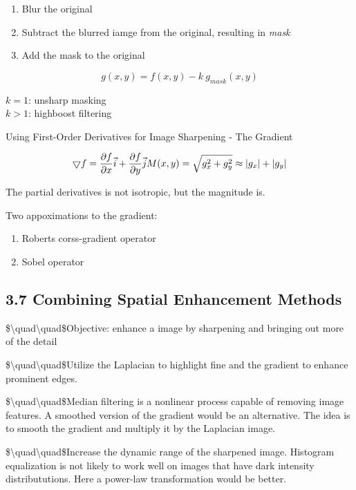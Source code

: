 \documentclass[]{article}
\begin{document}
\begin{enumerate}
\def\labelenumi{\arabic{enumi}.}
\item
  Blur the original
\item
  Subtract the blurred iamge from the original, resulting in \emph{mask}
\item
  Add the mask to the original
\end{enumerate}

\[g(x,y)=f(x,y)-k\ g_{mask}(x,y)\]

\(k=1\): unsharp masking\\
 \(k>1\): highboost filtering

Using First-Order Derivatives for Image Sharpening - The Gradient

\[\bigtriangledown f = \dfrac{\partial f}{\partial x}\vec{i}+ \dfrac{\partial f}{\partial y}\vec{j}\\
M(x,y)=\sqrt{g_x^2+g_y^2}\approx |g_x|+|g_y|\]

The partial derivatives is not isotropic, but the magnitude is.

Two appoximations to the gradient:\\

\begin{enumerate}
\def\labelenumi{\arabic{enumi}.}
\item
  Roberts corss-gradient operator
\item
  Sobel operator
\end{enumerate}

\subsection{3.7 Combining Spatial Enhancement
Methods}\label{header-n349}

\$\textbackslash{}quad\textbackslash{}quad\$Objective: enhance a image
by sharpening and bringing out more of the detail

\$\textbackslash{}quad\textbackslash{}quad\$Utilize the Laplacian to
highlight fine and the gradient to enhance prominent edges.

\$\textbackslash{}quad\textbackslash{}quad\$Median filtering is a
nonlinear process capable of removing image features. A smoothed version
of the gradient would be an alternative. The idea is to smooth the
gradient and multiply it by the Laplacian image.

\$\textbackslash{}quad\textbackslash{}quad\$Increase the dynamic range
of the sharpened image. Histogram equalization is not likely to work
well on images that have dark intensity distribututions. Here a
power-law transformation would be better.
\end{document}
